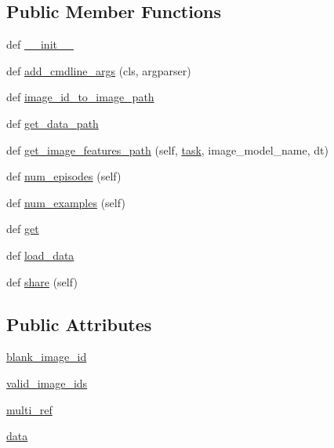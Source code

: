 \subsection*{Public Member Functions}
\begin{DoxyCompactItemize}
\item 
def \hyperlink{classparlai_1_1tasks_1_1igc_1_1agents_1_1IGCTeacher_a56ba9c5769024cd49924309006c86c5a}{\+\_\+\+\_\+init\+\_\+\+\_\+}
\item 
def \hyperlink{classparlai_1_1tasks_1_1igc_1_1agents_1_1IGCTeacher_ac035ed9d99a20a3e9d17870c777f178c}{add\+\_\+cmdline\+\_\+args} (cls, argparser)
\item 
def \hyperlink{classparlai_1_1tasks_1_1igc_1_1agents_1_1IGCTeacher_ac694aa2497060d57b33163868d0874d2}{image\+\_\+id\+\_\+to\+\_\+image\+\_\+path}
\item 
def \hyperlink{classparlai_1_1tasks_1_1igc_1_1agents_1_1IGCTeacher_a0b521361c618914b791a79dda5e81c41}{get\+\_\+data\+\_\+path}
\item 
def \hyperlink{classparlai_1_1tasks_1_1igc_1_1agents_1_1IGCTeacher_a0cbe8d58cdb4a4ad174cd5cdfe16b9e3}{get\+\_\+image\+\_\+features\+\_\+path} (self, \hyperlink{classparlai_1_1core_1_1teachers_1_1AbstractImageTeacher_a78dca77e43183d22d75140ca113d821c}{task}, image\+\_\+model\+\_\+name, dt)
\item 
def \hyperlink{classparlai_1_1tasks_1_1igc_1_1agents_1_1IGCTeacher_a17c1b4fa67edfa3f138e596822298823}{num\+\_\+episodes} (self)
\item 
def \hyperlink{classparlai_1_1tasks_1_1igc_1_1agents_1_1IGCTeacher_a3039139bd8c026b410abf1852f847935}{num\+\_\+examples} (self)
\item 
def \hyperlink{classparlai_1_1tasks_1_1igc_1_1agents_1_1IGCTeacher_a96b554e753849931b6b45502f26cc39e}{get}
\item 
def \hyperlink{classparlai_1_1tasks_1_1igc_1_1agents_1_1IGCTeacher_acf14f2bf20b4954bb44b77d8feaadaea}{load\+\_\+data}
\item 
def \hyperlink{classparlai_1_1tasks_1_1igc_1_1agents_1_1IGCTeacher_a9e0f104aaf5a36d0990893450c0ac135}{share} (self)
\end{DoxyCompactItemize}
\subsection*{Public Attributes}
\begin{DoxyCompactItemize}
\item 
\hyperlink{classparlai_1_1tasks_1_1igc_1_1agents_1_1IGCTeacher_a588193db220eb043d8b2dcb085323a14}{blank\+\_\+image\+\_\+id}
\item 
\hyperlink{classparlai_1_1tasks_1_1igc_1_1agents_1_1IGCTeacher_a1c8d19fc62c1a444c3c07b5b0ee49cc1}{valid\+\_\+image\+\_\+ids}
\item 
\hyperlink{classparlai_1_1tasks_1_1igc_1_1agents_1_1IGCTeacher_aff125a4d2f66e6a8cf282253913850d4}{multi\+\_\+ref}
\item 
\hyperlink{classparlai_1_1tasks_1_1igc_1_1agents_1_1IGCTeacher_a23adac78cbb7a5761f66fea8809bcee4}{data}
\end{DoxyCompactItemize}


